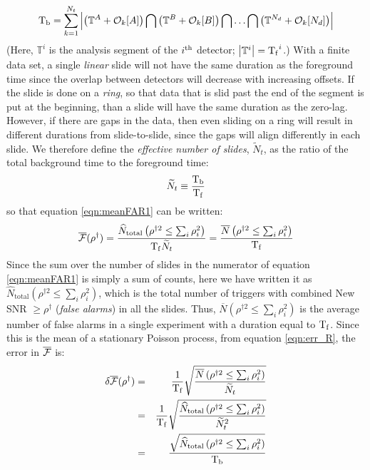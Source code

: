 \begin{equation}
\label{eqn:tBackground}
\Tb = \sum_{k=1}^{N_t} \left| \left( \mathbb{T}^A + \mathcal{O}_k[A] \right) \bigcap \left( \mathbb{T}^B + \mathcal{O}_k[B] \right) \bigcap \ldots \bigcap \left( \mathbb{T}^{N_d} + \mathcal{O}_k[N_d] \right) \right|
\end{equation}
(Here, $\mathbb{T}^i$ is the analysis segment of the $i^{\mathrm{th}}$ detector; $\left| \mathbb{T}^i \right| = \mathrm{T_f}^i$.) With a finite data set, a single \emph{linear} slide will not have the same duration as the foreground time since the overlap between detectors will decrease with increasing offsets. If the slide is done on a \emph{ring}, so that data that is slid past the end of the segment is put at the beginning, than a slide will have the same duration as the zero-lag. However, if there are gaps in the data, then even sliding on a ring will result in different durations from slide-to-slide, since the gaps will align differently in each slide. We therefore define the \emph{effective number of slides}, $\widetilde{N}_t$, as the ratio of the total background time to the foreground time:
\begin{equation}
\label{eqn:effective_Nslides}
\widetilde{N}_t \equiv \frac{\Tb}{\Tf}
\end{equation}
so that equation \ref{eqn:meanFAR1} can be written:
\begin{equation}
\label{eqn:meanFAR2}
\overline{\far}(\rho^\dagger) = \frac{\widehat{N}_{\mathrm{total}} \left(\rho^{\dagger2} \leq \sum_{i} \rho_i^2 \right)}{\Tf \widetilde{N}_t} = \frac{\overline{N} \left(\rho^{\dagger2} \leq \sum_{i} \rho_i^2 \right)}{\Tf}
\end{equation}
Since the sum over the number of slides in the numerator of equation \ref{eqn:meanFAR1} is simply a sum of counts, here we have written it as $\widehat{N}_{\mathrm{total}} \left(\rho^{\dagger2} \leq \sum_{i} \rho_i^2 \right)$, which is the total number of triggers with combined New \ac{SNR} $\geq \rho^\dagger$ (\emph{false alarms}) in all the slides. Thus, $\overline{N} \left(\rho^{\dagger2} \leq \sum_{i} \rho_i^2 \right)$ is the average number of false alarms in a single experiment with a duration equal to $\mathrm{T_f}$. Since this is the mean of a stationary Poisson process, from equation \ref{eqn:err_R}, the error in $\overline{\mathcal{F}}$ is:
\begin{eqnarray}
\label{eqn:err_FAR}
\delta \overline{\far}(\rho^\dagger) & = & \frac{1}{\Tf} \sqrt{\frac{\overline{N} \left(\rho^{\dagger2} \leq \sum_{i} \rho_i^2 \right)}{\widetilde{N}_t}} \nonumber \\
 & = & \frac{1}{\Tf} \sqrt{\frac{\widehat{N}_{\mathrm{total}} \left(\rho^{\dagger2} \leq \sum_{i} \rho_i^2 \right)}{\widetilde{N}_t^2}} \nonumber \\
 & = & \frac{\sqrt{\widehat{N}_{\mathrm{total}} \left(\rho^{\dagger2} \leq \sum_{i} \rho_i^2 \right)}}{\Tb}
\end{eqnarray}

